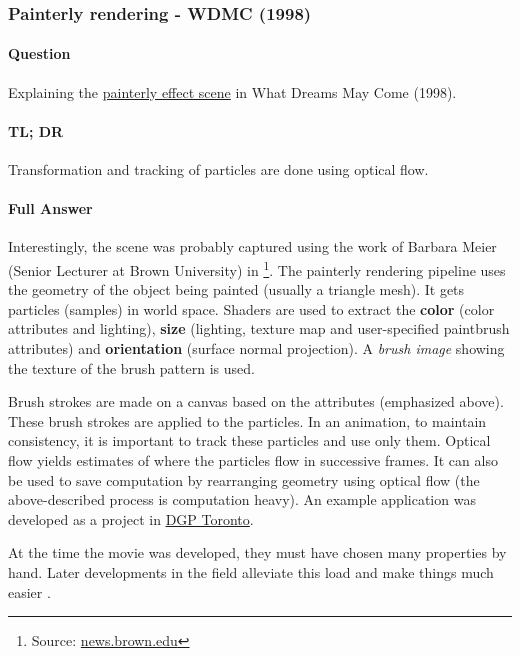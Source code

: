 \subsubsection{Painterly rendering - WDMC (1998)}

\paragraph*{Question}
Explaining the \href{https://www.youtube.com/watch?v=CYonzhFT_z4}{painterly effect scene} in What Dreams May Come (1998).

\paragraph*{TL; DR}
Transformation and tracking of particles are done using optical flow.

\paragraph*{Full Answer}

Interestingly, the scene was probably captured using the work of Barbara Meier (Senior Lecturer at Brown University) in \cite{meier1996painterly} \footnote[6]{Source: \href{https://news.brown.edu/new-faculty/physical-sciences/barbara-meier}{news.brown.edu}}. The painterly rendering pipeline uses the geometry of the object being painted (usually a triangle mesh). It gets particles (samples) in world space. Shaders are used to extract the \textbf{color} (color attributes and lighting), \textbf{size} (lighting, texture map and user-specified paintbrush attributes) and \textbf{orientation} (surface normal projection). A \emph{brush image} showing the texture of the brush pattern is used. 

Brush strokes are made on a canvas based on the attributes (emphasized above). These brush strokes are applied to the particles. In an animation, to maintain consistency, it is important to track these particles and use only them. Optical flow yields estimates of where the particles flow in successive frames. It can also be used to save computation by rearranging geometry using optical flow (the above-described process is computation heavy). An example application was developed as a project in \href{https://www.dgp.toronto.edu/~mccrae/projects/paintanimation/#:~:text=The%20project%20allows%20one%20to,temporal%20artifacts%20can%20be%20produced}{DGP Toronto}.

At the time the movie was developed, they must have chosen many properties by hand. Later developments in the field alleviate this load and make things much easier \cite{painterly-animation-1, painterly-animation-2,painterly-animation-3}.

